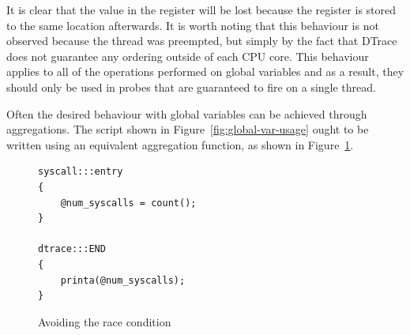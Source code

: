 \noindent
It is clear that the value in the  register will be lost because
the register  is stored to the same location afterwards. It is
worth noting that this behaviour is not observed because the thread was
preempted, but simply by the fact that DTrace does not guarantee any ordering
outside of each CPU core. This behaviour applies to all of the operations
performed on global variables and as a result, they should only be used in
probes that are guaranteed to fire on a single thread. \newline

\noindent
Often the desired behaviour with global variables can be achieved through
aggregations. The script shown in Figure~\ref{fig:global-var-usage} ought to be
written using an equivalent aggregation function, as shown in
Figure~\ref{fig:avoiding-the-race}.

\begin{figure}
  \begin{lstlisting}
syscall:::entry
{
    @num_syscalls = count();
}

dtrace:::END
{
    printa(@num_syscalls);
}
  \end{lstlisting}
  \caption{Avoiding the race condition}
  \label{fig:avoiding-the-race}
\end{figure}




